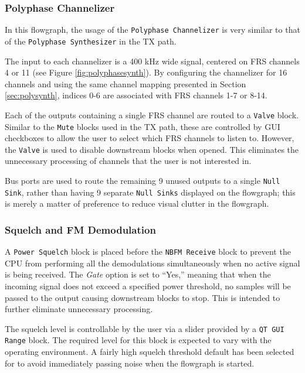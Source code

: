 \subsubsection{Polyphase Channelizer}

In this flowgraph, the usage of the \texttt{Polyphase Channelizer} is very
similar to that of the \texttt{Polyphase Synthesizer} in the \ac{TX} path.

The input to each channelizer is a 400 kHz wide signal, centered on \ac{FRS}
channels 4 or 11 (see Figure \ref{fig:polyphasesynth}). By configuring the
channelizer for 16 channels and using the same channel mapping presented in
Section \ref{sec:polysynth}, indices 0-6 are associated with \ac{FRS}
channels 1-7 or 8-14.

Each of the outputs containing a single \ac{FRS} channel are routed to
a \texttt{Valve} block.  Similar to the \texttt{Mute} blocks used in the \ac{TX}
path, these are controlled by \ac{GUI} checkboxes to allow the user to select which
\ac{FRS} channels to listen to. However, the \texttt{Valve} is used
to disable downstream blocks when opened. This eliminates the unnecessary
processing of channels that the user is not interested in.

Bus ports \cite{TRONDEAU_BUSPORT} are used to route the remaining 9 unused
outputs to a single \texttt{Null Sink}, rather than having 9 separate
\texttt{Null Sinks} displayed on the flowgraph; this is merely a matter of
preference to reduce visual clutter in the flowgraph.

\subsubsection{Squelch and FM Demodulation} \label{sec:fm_demod}

A \texttt{Power Squelch} block is placed before the \texttt{NBFM Receive} block
to prevent the CPU from performing all the demodulations simultaneously when no
active signal is being received. The \textit{Gate} option is set to ``Yes,''
meaning that when the incoming signal does not exceed a specified power threshold,
no samples will be passed to the output causing downstream blocks to stop. This
is intended to further eliminate unnecessary processing.

The squelch level is controllable by the user via a slider provided by a
\texttt{QT GUI Range} block. The required level for this block is expected to
vary with the operating environment. A fairly high squelch threshold default
has been selected for to avoid immediately passing noise when the flowgraph is
started.

